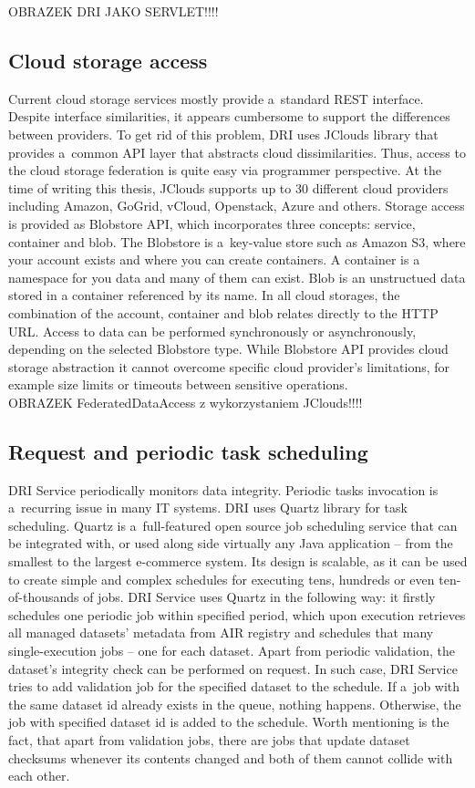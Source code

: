 OBRAZEK DRI JAKO SERVLET!!!!

		\subsection{Cloud storage access}
Current cloud storage services mostly provide a~standard REST interface.
Despite interface similarities, it appears cumbersome to support the
differences between providers. To get rid of this problem, DRI uses JClouds
\cite{jclouds} library that provides a~common API layer that abstracts cloud
dissimilarities. Thus, access to the cloud storage federation is quite easy
via programmer perspective. At the time of writing this thesis, JClouds
supports up to 30 different cloud providers including Amazon, GoGrid, vCloud,
Openstack, Azure and others. Storage access is provided as Blobstore API, which
incorporates three concepts: service, container and blob. The Blobstore is
a~key-value store such as Amazon S3, where your account exists and where you
can create containers. A container is a namespace for you data and many of them
can exist. Blob is an unstructued data stored in a container referenced by
its name. In all cloud storages, the combination of the account, container and
blob relates directly to the HTTP URL. Access to data can be performed
synchronously or asynchronously, depending on the selected Blobstore type.
While Blobstore API provides cloud storage abstraction it cannot overcome
specific cloud provider's limitations, for example size limits or timeouts
between sensitive operations.\\

OBRAZEK FederatedDataAccess z wykorzystaniem JClouds!!!!

		\subsection{Request and periodic task scheduling}
DRI Service periodically monitors data integrity. Periodic tasks invocation
is a~recurring issue in many IT systems. DRI uses Quartz library \cite{quartz}
for task scheduling. Quartz is a~full-featured open source job scheduling
service that can be integrated with, or used along side virtually any Java
application -- from the smallest to the largest e-commerce system. Its design
is scalable, as it can be used to create simple and complex schedules for
executing tens, hundreds or even ten-of-thousands of jobs. DRI Service uses
Quartz in the following way: it firstly schedules one periodic job within
specified period, which upon execution retrieves all managed datasets' metadata
from AIR registry and schedules that many single-execution jobs -- one for each
dataset. Apart from periodic validation, the dataset's integrity check can be
performed on request. In such case, DRI Service tries to add validation job for
the specified dataset to the schedule. If a~job with the same dataset id
already exists in the queue, nothing happens. Otherwise, the job with specified
dataset id is added to the schedule. Worth mentioning is the fact, that apart
from validation jobs, there are jobs that update dataset checksums whenever its
contents changed and both of them cannot collide with each other.\\

